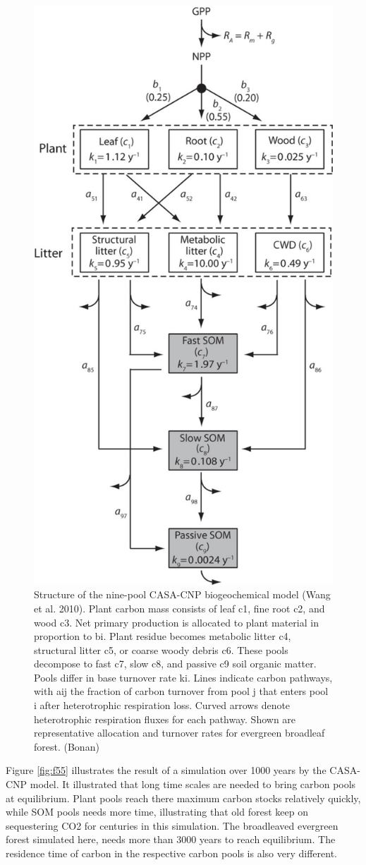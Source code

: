 \documentclass[12pt,oneside]{book}
\begin{document}
\begin{figure}

{\centering \includegraphics[width=0.6\linewidth]{figures/chap5/f54_casa_cnp} 

}

\caption{Structure of the nine-pool CASA-CNP biogeochemical model (Wang et al. 2010). Plant carbon mass consists of leaf c1, fine root c2, and wood c3. Net primary production is allocated to plant material in proportion to bi. Plant residue becomes metabolic litter c4, structural litter c5, or coarse woody debris c6. These pools decompose to fast c7, slow c8, and passive c9 soil organic matter. Pools differ in base turnover rate ki. Lines indicate carbon pathways, with aij the fraction of carbon turnover from pool j that enters pool i after heterotrophic respiration loss. Curved arrows denote heterotrophic respiration fluxes for each pathway. Shown are representative allocation and turnover rates for evergreen broadleaf forest. (Bonan)}\label{fig:f54}
\end{figure}

Figure \ref{fig:f55} illustrates the result of a simulation over 1000
years by the CASA-CNP model. It illustrated that long time scales are
needed to bring carbon pools at equilibrium. Plant pools reach there
maximum carbon stocks relatively quickly, while SOM pools needs more
time, illustrating that old forest keep on sequestering CO2 for
centuries in this simulation. The broadleaved evergreen forest simulated
here, needs more than 3000 years to reach equilibrium. The residence
time of carbon in the respective carbon pools is also very different.
\end{document}
